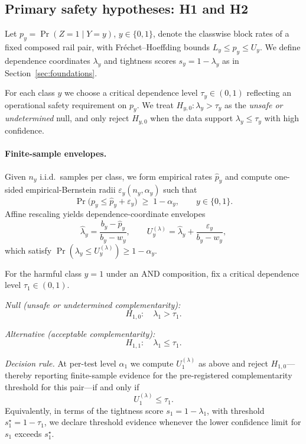 \subsection{Primary safety hypotheses: H1 and H2}
\label{subsec:primary-hypotheses}

Let $p_y = \Pr(Z=1 \mid Y=y)$, $y\in\{0,1\}$, denote the classwise
block rates of a fixed composed rail pair, with Fr\'echet--Hoeffding
bounds $L_y \le p_y \le U_y$.
We define dependence coordinates $\lambda_y$ and tightness scores
$s_y = 1-\lambda_y$ as in Section~\ref{sec:foundations}.

For each class $y$ we choose a critical dependence level
$\tau_y \in (0,1)$ reflecting an operational safety requirement on
$p_y$.
We treat $H_{y,0}:\lambda_y > \tau_y$ as the \emph{unsafe or
undetermined} null, and only reject $H_{y,0}$ when the data support
$\lambda_y \le \tau_y$ with high confidence.

\paragraph{Finite-sample envelopes.}
Given $n_y$ i.i.d.\ samples per class, we form empirical rates
$\hat p_y$ and compute one-sided empirical-Bernstein radii
$\varepsilon_y(n_y,\alpha_y)$ such that
\begin{equation}
  \Pr\bigl( p_y \le \hat p_y + \varepsilon_y \bigr)
  \;\ge\; 1-\alpha_y,
  \qquad y\in\{0,1\}.
  \label{eq:bernstein-H}
\end{equation}
Affine rescaling yields dependence-coordinate envelopes
\[
  \hat\lambda_y =
  \frac{b_y - \hat p_y}{b_y - w_y},\qquad
  U^{(\lambda)}_y =
  \hat\lambda_y + \frac{\varepsilon_y}{b_y - w_y},
\]
which satisfy
$\Pr(\lambda_y \le U^{(\lambda)}_y) \ge 1-\alpha_y$.

\begin{hypothesis}
\label{hyp:H1-final}
For the harmful class $y=1$ under an AND composition, fix a
critical dependence level $\tau_1 \in (0,1)$.

\emph{Null (unsafe or undetermined complementarity):}
\[
  H_{1,0}:\quad \lambda_1 > \tau_1.
\]

\emph{Alternative (acceptable complementarity):}
\[
  H_{1,1}:\quad \lambda_1 \le \tau_1.
\]

\emph{Decision rule.}
At per-test level $\alpha_1$ we compute $U^{(\lambda)}_1$ as above
and reject $H_{1,0}$---thereby reporting finite-sample evidence for
the pre-registered complementarity threshold for this pair---if and only if
\begin{equation}
  U^{(\lambda)}_1 \le \tau_1.
  \label{eq:H1-rule-final}
\end{equation}
Equivalently, in terms of the tightness score
$s_1 = 1-\lambda_1$, with threshold $s_1^\star = 1-\tau_1$, we
declare threshold evidence whenever the lower confidence limit for $s_1$ exceeds
$s_1^\star$.
\end{hypothesis}

